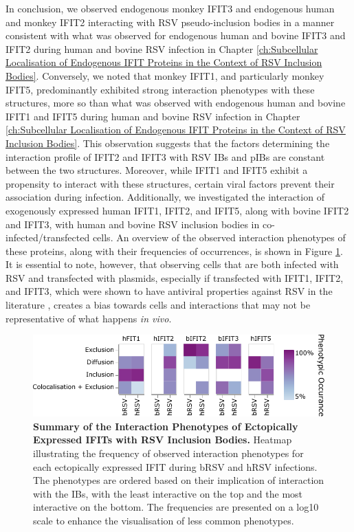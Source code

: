 In conclusion, we observed endogenous monkey IFIT3 and endogenous human and monkey IFIT2 interacting with RSV pseudo-inclusion bodies in a manner consistent with what was observed for endogenous human and bovine IFIT3 and IFIT2 during human and bovine RSV infection in Chapter \ref{ch:Subcellular Localisation of Endogenous IFIT Proteins in the Context of RSV Inclusion Bodies}. Conversely, we noted that monkey IFIT1, and particularly monkey IFIT5, predominantly exhibited strong interaction phenotypes with these structures, more so than what was observed with endogenous human and bovine IFIT1 and IFIT5 during human and bovine RSV infection in Chapter \ref{ch:Subcellular Localisation of Endogenous IFIT Proteins in the Context of RSV Inclusion Bodies}. This observation suggests that the factors determining the interaction profile of IFIT2 and IFIT3 with RSV IBs and pIBs are constant between the two structures. Moreover, while IFIT1 and IFIT5 exhibit a propensity to interact with these structures, certain viral factors prevent their association during infection. Additionally, we investigated the interaction of exogenously expressed human IFIT1, IFIT2, and IFIT5, along with bovine IFIT2 and IFIT3, with human and bovine RSV inclusion bodies in co-infected/transfected cells. An overview of the observed interaction phenotypes of these proteins, along with their frequencies of occurrences, is shown in Figure \ref{fig:Summary of the Interaction Phenotypes of Ectopically Expressed IFITs with RSV Inclusion Bodies}. It is essential to note, however, that observing cells that are both infected with RSV and transfected with plasmids, especially if transfected with IFIT1, IFIT2, and IFIT3, which were shown to have antiviral properties against RSV in the literature \cite{Drori2020InfluenzaProteins}, creates a bias towards cells and interactions that may not be representative of what happens \textit{in vivo}.

\begin{figure}
    \centering
    \includegraphics[width=1\linewidth]{09. Chapter 4/Figs/heatmap-infection-transfection.pdf}
    \caption[Summary of the Interaction Phenotypes of Ectopically Expressed IFITs with RSV Inclusion Bodies.]{\textbf{Summary of the Interaction Phenotypes of Ectopically Expressed IFITs with RSV Inclusion Bodies.} Heatmap illustrating the frequency of observed interaction phenotypes for each ectopically expressed IFIT during bRSV and hRSV infections. The phenotypes are ordered based on their implication of interaction with the IBs, with the least interactive on the top and the most interactive on the bottom. The frequencies are presented on a log10 scale to enhance the visualisation of less common phenotypes.}
    \label{fig:Summary of the Interaction Phenotypes of Ectopically Expressed IFITs with RSV Inclusion Bodies}
\end{figure}

